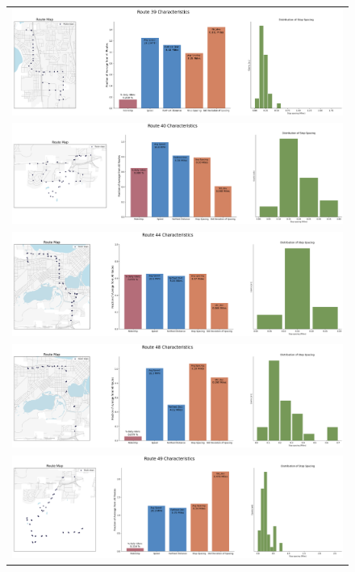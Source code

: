 \documentclass[letter]{article}
\begin{document}
\begin{figure}
\begin{center}
\begin{tabular}{ c }

  \includegraphics[width=150mm]{Route_39.png}  \\
  \includegraphics[width=150mm]{Route_40.png}  \\
  \includegraphics[width=150mm]{Route_44.png} \\ 
  \includegraphics[width=150mm]{Route_48.png}  \\
  \includegraphics[width=150mm]{Route_49.png}  \\
  
  \end{tabular}
\end{center}
\end{figure}
\end{document}
